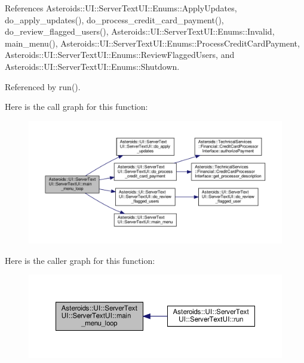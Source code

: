 References Asteroids\+::\+U\+I\+::\+Server\+Text\+U\+I\+::\+Enums\+::\+Apply\+Updates, do\+\_\+apply\+\_\+updates(), do\+\_\+process\+\_\+credit\+\_\+card\+\_\+payment(), do\+\_\+review\+\_\+flagged\+\_\+users(), Asteroids\+::\+U\+I\+::\+Server\+Text\+U\+I\+::\+Enums\+::\+Invalid, main\+\_\+menu(), Asteroids\+::\+U\+I\+::\+Server\+Text\+U\+I\+::\+Enums\+::\+Process\+Credit\+Card\+Payment, Asteroids\+::\+U\+I\+::\+Server\+Text\+U\+I\+::\+Enums\+::\+Review\+Flagged\+Users, and Asteroids\+::\+U\+I\+::\+Server\+Text\+U\+I\+::\+Enums\+::\+Shutdown.



Referenced by run().

Here is the call graph for this function\+:\nopagebreak
\begin{figure}[H]
\begin{center}
\leavevmode
\includegraphics[width=350pt]{classAsteroids_1_1UI_1_1ServerTextUI_1_1ServerTextUI_aae7cc1a6a551fc4dbd5ac7270f1d3e94_cgraph}
\end{center}
\end{figure}
Here is the caller graph for this function\+:\nopagebreak
\begin{figure}[H]
\begin{center}
\leavevmode
\includegraphics[width=350pt]{classAsteroids_1_1UI_1_1ServerTextUI_1_1ServerTextUI_aae7cc1a6a551fc4dbd5ac7270f1d3e94_icgraph}
\end{center}
\end{figure}
\mbox{\label{classAsteroids_1_1UI_1_1ServerTextUI_1_1ServerTextUI_a92fb489434b5bd2a9e91f5d77c9832ac}} 
